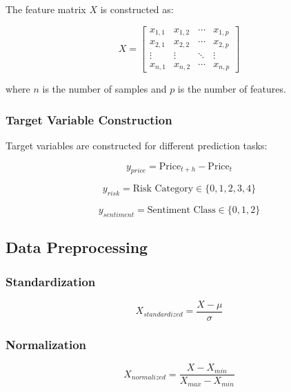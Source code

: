 \documentclass[12pt,a4paper]{article}
\begin{document}
The feature matrix $X$ is constructed as:

\begin{equation}
X = \begin{bmatrix}
x_{1,1} & x_{1,2} & \cdots & x_{1,p} \\
x_{2,1} & x_{2,2} & \cdots & x_{2,p} \\
\vdots & \vdots & \ddots & \vdots \\
x_{n,1} & x_{n,2} & \cdots & x_{n,p}
\end{bmatrix}
\end{equation}

where $n$ is the number of samples and $p$ is the number of features.

\subsubsection{Target Variable Construction}

Target variables are constructed for different prediction tasks:

\begin{equation}
y_{price} = \text{Price}_{t+h} - \text{Price}_t
\end{equation}

\begin{equation}
y_{risk} = \text{Risk Category} \in \{0, 1, 2, 3, 4\}
\end{equation}

\begin{equation}
y_{sentiment} = \text{Sentiment Class} \in \{0, 1, 2\}
\end{equation}

\subsection{Data Preprocessing}

\subsubsection{Standardization}

\begin{equation}
X_{standardized} = \frac{X - \mu}{\sigma}
\end{equation}

\subsubsection{Normalization}

\begin{equation}
X_{normalized} = \frac{X - X_{min}}{X_{max} - X_{min}}
\end{equation}
\end{document}
